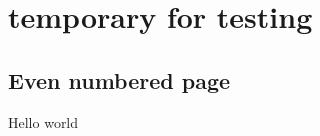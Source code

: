 \documentclass[twoside]{article}
\begin{document}
\tableofcontents

\cleardoublepage{}

\section{temporary for testing}
\newpage
\subsection{Even numbered page}
Hello world
%
\end{document}
